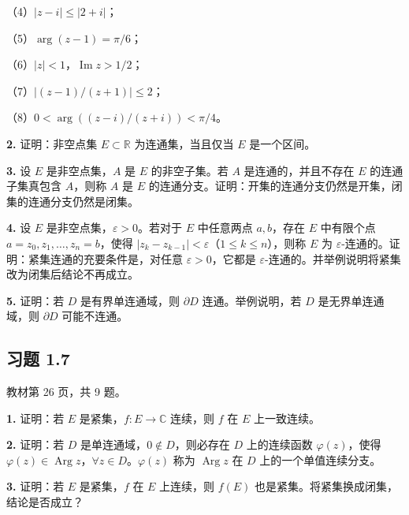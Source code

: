 \documentclass[11pt,a4paper]{article}
\begin{document}
（4）\(|z-i|\le|2+i|\)；

（5）\(\arg(z-1)=\pi/6\)；

（6）\(|z|<1\)，\(\operatorname{Im}z>1/2\)；

（7）\(|(z-1)/(z+1)|\le2\)；

（8）\(0<\arg((z-i)/(z+i))<\pi/4\)。

\par{}
\noindent\textbf{2.} 证明：非空点集 \(E\subset\mathbb R\) 为连通集，当且仅当
\(E\) 是一个区间。

\par{}
\noindent\textbf{3.} 设 \(E\) 是非空点集，\(A\) 是 \(E\) 的非空子集。若 \(A\)
是连通的，并且不存在 \(E\) 的连通子集真包含 \(A\)，则称 \(A\) 是 \(E\)
的连通分支。证明：开集的连通分支仍然是开集，闭集的连通分支仍然是闭集。

\par{}
\noindent\textbf{4.} 设 \(E\) 是非空点集，\(\varepsilon>0\)。若对于 \(E\)
中任意两点 \(a,b\)，存在 \(E\) 中有限个点
\(a=z_0,z_1,\ldots,z_n=b\)，使得
\(|z_k-z_{k-1}|<\varepsilon\)（\(1\le k\le n\)），则称 \(E\) 为
\(\varepsilon\)-连通的。证明：紧集连通的充要条件是，对任意
\(\varepsilon>0\)，它都是
\(\varepsilon\)-连通的。并举例说明将紧集改为闭集后结论不再成立。

\par{}
\noindent\textbf{5.} 证明：若 \(D\) 是有界单连通域，则 \(\partial D\)
连通。举例说明，若 \(D\) 是无界单连通域，则 \(\partial D\) 可能不连通。

\subsection{习题 1.7}\label{ux4e60ux9898-1.7}

教材第 26 页，共 9 题。

\par{}
\noindent\textbf{1.} 证明：若 \(E\) 是紧集，\(f:E\to\mathbb C\) 连续，则 \(f\) 在
\(E\) 上一致连续。

\par{}
\noindent\textbf{2.} 证明：若 \(D\) 是单连通域，\(0\notin D\)，则必存在 \(D\)
上的连续函数 \(\varphi(z)\)，使得
\(\varphi(z)\in\operatorname{Arg}z\)，\(\forall z\in D\)。\(\varphi(z)\)
称为 \(\operatorname{Arg}z\) 在 \(D\) 上的一个单值连续分支。

\par{}
\noindent\textbf{3.} 证明：若 \(E\) 是紧集，\(f\) 在 \(E\) 上连续，则 \(f(E)\)
也是紧集。将紧集换成闭集，结论是否成立？
\end{document}
